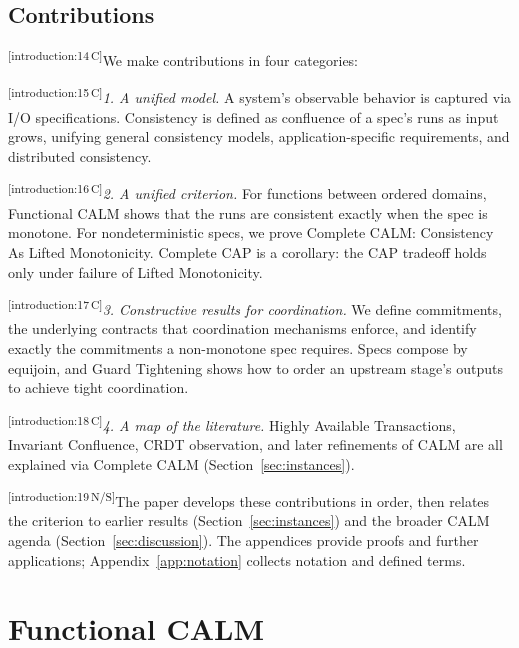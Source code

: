 \documentclass[sigconf]{cidr-2027}
\theoremstyle{remark}
\newcommand{\commitments}{commitments\xspace}
\newcommand{\spectype}[1][]{I/O specification#1\xspace}
\newcommand{\cxtag}[2]{\textsuperscript{\textsf{\tiny[#1\,#2]}}}
\begin{document}
\subsection{Contributions}
\color{black!45}\cxtag{introduction:14}{C}We make contributions in four categories:\color{black}

\color{black!45}\noindent
\cxtag{introduction:15}{C}\emph{1. A unified model.} A system's observable behavior is captured via
        \spectype[s]. Consistency is defined as
        confluence of a spec's runs as input grows, unifying general consistency models,
        application-specific requirements, and distributed consistency.\color{black}

\color{black!45}\noindent
\cxtag{introduction:16}{C}\emph{2. A unified criterion.} For functions between ordered domains,
        Functional CALM shows that the runs are consistent exactly when the spec is monotone. For nondeterministic specs,
        we prove Complete CALM: Consistency As Lifted Monotonicity. Complete CAP is a corollary:
        the CAP tradeoff holds only under failure of Lifted Monotonicity.\color{black}

\color{black!45}\noindent
\cxtag{introduction:17}{C}\emph{3. Constructive results for coordination.} We define \commitments,
        the underlying contracts that coordination mechanisms enforce,
        and identify exactly the \commitments a non-monotone spec requires.
        Specs compose by equijoin, and Guard Tightening shows how to order an
        upstream stage's outputs to achieve tight coordination.\color{black}

\color{black!45}\noindent
\cxtag{introduction:18}{C}\emph{4. A map of the literature.} Highly Available Transactions, Invariant
        Confluence, CRDT observation, and later refinements of CALM are all
        explained via Complete CALM (Section~\ref{sec:instances}).\color{black}

\color{black}\vspace{0.5em}
\noindent
\cxtag{introduction:19}{N/S}The paper develops these contributions in order, then relates the criterion to
earlier results (Section~\ref{sec:instances}) and the broader CALM agenda
(Section~\ref{sec:discussion}).  The appendices provide proofs and further
applications; Appendix~\ref{app:notation} collects notation and defined terms.\color{black}

\section{Functional CALM}
\label{sec:functional-calm}
\end{document}
